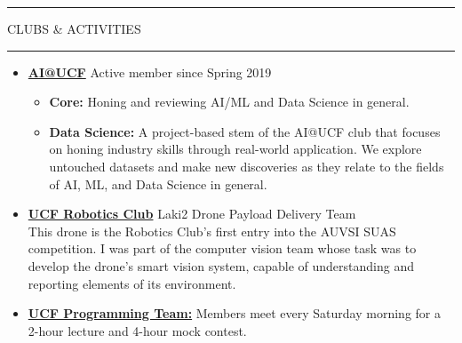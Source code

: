 \documentclass{article}
\newcommand{\makesection}[1]{\hrule\vskip1mm\uppercase{#1}\vskip1mm\hrule}
\begin{document}
\makesection{Clubs \& Activities}
\begin{itemize}[leftmargin=.35cm]

    \item \textbf{\href{https://ucfai.org}{AI@UCF}} Active member since Spring 2019
    \vspace*{-1.5mm}
    \raggedright
    \begin{itemize}[$\circ$]
        \item \textbf{Core:} Honing and reviewing AI/ML and Data Science in general.
        \item \textbf{Data Science:} A project-based stem of the AI@UCF club that focuses on honing industry skills through real-world application. We explore untouched datasets and make new discoveries as they relate to the fields of AI, ML, and Data Science in general.
    \end{itemize}

    \item \textbf{\href{https://robotics.ucf.edu/projects/2019}{UCF Robotics Club}} Laki2 Drone Payload Delivery Team \\
    This drone is the Robotics Club's first entry into the AUVSI SUAS competition. I was part of the computer vision team whose task was to develop the drone's smart vision system, capable of understanding and reporting elements of its environment.

    \item \textbf{\href{https://www.ucfprogrammingteam.org}{UCF Programming Team:}} Members meet every Saturday morning for a 2-hour lecture and 4-hour mock contest.
\end{itemize}
\end{document}
